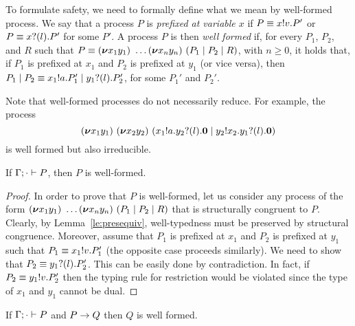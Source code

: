 To formulate safety, we need to formally define what we mean by
well-formed process.  We say that a process \( P \) is \emph{prefixed
  at variable \( x \)} if \( P\equiv x ! v . P' \) or
\( P\equiv x ? (l) . P' \) for some $P'$.
%
A process $P$ is then \emph{well formed} if, for every $P_1$, $P_2$,
and $R$ such that
\( P\equiv (\bm{\nu} x_1y_1)~\dots
  (\bm{\nu} x_ny_n)~(P_1 \mid P_2 \mid R) \), with
\( n \geq 0 \), it holds that, if \( P_1 \) is prefixed at \( x_1 \)
and \( P_2 \) is prefixed at \( y_1 \) (or vice versa), then
\( P_1 \mid P_2
\equiv x_1 ! a . P_1' \mid y_1 ? (l) . P_2' \), for some
$P_1'$ and $P_2'$.

Note that well-formed processes do not necessarily reduce. For example, the process
\begin{equation*}
  (\bm{\nu} x_1y_1)~(\bm{\nu} x_2y_2)~(x_1 ! a . y_2 ? (l) . \bm{0} \mid y_2 ! x_2 . y_1 ? (l) . \bm{0})
\end{equation*}
is well formed but also irreducible.

\begin{theorem}
  If \( \Gamma;\cdot \vdash P \), then \( P \) is well-formed.
\end{theorem}
\begin{proof}
  In order to prove that $P$ is well-formed, let us consider any
  process of the form
  $(\bm{\nu} x_1y_1)~\dots
    (\bm{\nu} x_ny_n)~(P_1 \mid P_2 \mid R)$ that is
  structurally congruent to $P$. Clearly, by Lemma~\ref{le:presequiv},
  well-typedness must be preserved by structural congruence. Moreover,
  assume that $P_1$ is prefixed at $x_1$ and $P_2$ is prefixed at
  $y_1$ such that $P_1 \equiv x_1 ! v . P_1'$ (the opposite
  case proceeds similarly). We need to show that
  $P_2 \equiv y_1 ? (l) . P_2'$. This can be easily done by
  contradiction. In fact, if $P_2 \equiv y_1 ! v . P_2'$ then
  the typing rule for restriction would be violated since the type of
  $x_1$ and $y_1$ cannot be dual.
\end{proof}

\begin{corollary}
  If \( \Gamma;\cdot \vdash P \) and \( P \rightarrow Q \) then \( Q \) is well formed.
\end{corollary}
